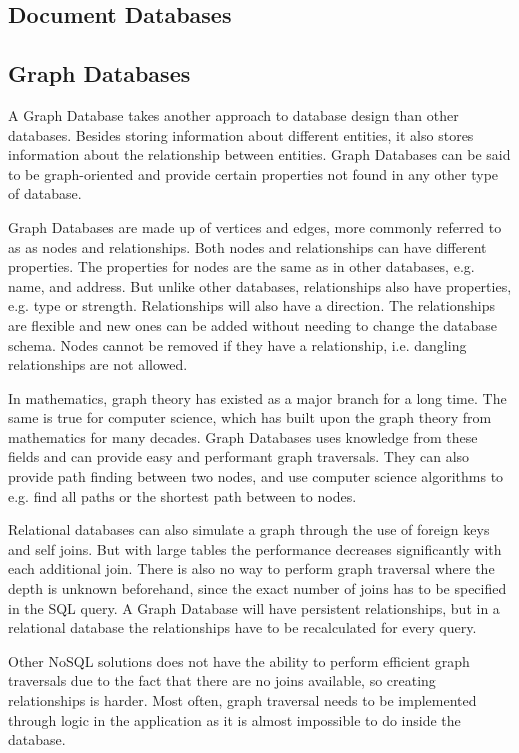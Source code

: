 \subsection{Document Databases}
\label{intro-doc-db}

\subsection{Graph Databases}
\label{intro-graph-db}
A Graph Database takes another approach to database design than other databases. Besides storing information about different entities, it also stores information about the relationship between entities. Graph Databases can be said to be graph-oriented and provide certain properties not found in any other type of database.

Graph Databases are made up of vertices and edges, more commonly referred to as as nodes and relationships. Both nodes and relationships can have different properties. The properties for nodes are the same as in other databases, e.g. name, and address. But unlike other databases, relationships also have properties, e.g. type or strength. Relationships will also have a direction. The relationships are flexible and new ones can be added without needing to change the database schema. Nodes cannot be removed if they have a relationship, i.e. dangling relationships are not allowed.

In mathematics, graph theory has existed as a major branch for a long time. The same is true for computer science, which has built upon the graph theory from mathematics for many decades. Graph Databases uses knowledge from these fields and can provide easy and performant graph traversals. They can also provide path finding between two nodes, and use computer science algorithms to e.g. find all paths or the shortest path between to nodes.

Relational databases can also simulate a graph through the use of foreign keys and self joins. But with large tables the performance decreases significantly with each additional join. There is also no way to perform graph traversal where the depth is unknown beforehand, since the exact number of joins has to be specified in the SQL query. A Graph Database will have persistent relationships, but in a relational database the relationships have to be recalculated for every query.

Other NoSQL solutions does not have the ability to perform efficient graph traversals due to the fact that there are no joins available, so creating relationships is harder. Most often, graph traversal needs to be implemented through logic in the application as it is almost impossible to do inside the database.

